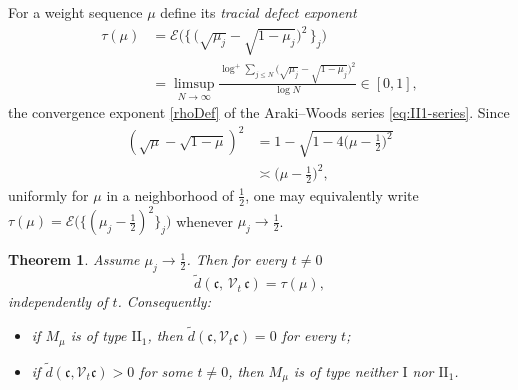 \documentclass[twoside,11pt,letter]{article}
\def\cV{{\mathcal{V}}}
\def\fc{{\mathfrak{c}}}
\newcommand{\cexp}{\mathcal{E}}  %
\newtheorem{theorem}{Theorem}[section]
\theoremstyle{definition}
\theoremstyle{definition}
\theoremstyle{plain}
\begin{document}
For a weight sequence $\mu$ define its \emph{tracial defect exponent}
\begin{equation}
\label{eq:tau}
\begin{split}
\tau(\mu)
&=\cexp \bigl( \bigl\{\, \bigl( \sqrt{\mu_j} - \sqrt{1-\mu_j} \bigr)^{2}\,\bigr\}_j \bigr)\\
&=\limsup_{N \to \infty} \frac{ \log^{+} \sum_{j \le N} \bigl( \sqrt{\mu_j} - \sqrt{1-\mu_j} \bigr)^{2} }{ \log N }\in [0,1],
\end{split}
\end{equation}
the convergence exponent \eqref{rhoDef} of the Araki--Woods series \eqref{eq:II1-series}. Since
\begin{equation*}
\begin{split}
(\sqrt{\mu} - \sqrt{1-\mu})^2 &= 1 - \sqrt{1 - 4\big(\mu - \frac12\big)^2}\\
&\asymp \big(\mu - \frac12\big)^2,
\end{split}
\end{equation*} 
uniformly for $\mu$ in a neighborhood of $\tfrac12$, one may equivalently write $\tau(\mu) = \cexp\bigl( \{ (\mu_j - \tfrac12)^2 \}_j \bigr)$ whenever
$\mu_j \to \tfrac12$.

\begin{theorem}
\label{thm:tracial}
Assume $\mu_j \to \tfrac12$. Then for every $t \neq 0$
\begin{equation}
\label{eq:tracial}
\tilde d ( \fc,\, \cV_t\,\fc ) = \tau(\mu),
\end{equation}
independently of $t$. Consequently:
\begin{itemize}
\item[(i)] if $M_\mu$ is of type $\mathrm{II}_1$, then $\tilde d(\fc, \cV_t\fc) = 0$ for every $t$;
\item[(ii)] if $\tilde d(\fc, \cV_t\fc) > 0$ for some $t \neq 0$, then $M_\mu$ is of type neither $\mathrm{I}$ nor $\mathrm{II}_1$.
\end{itemize}
\end{theorem}
\end{document}
